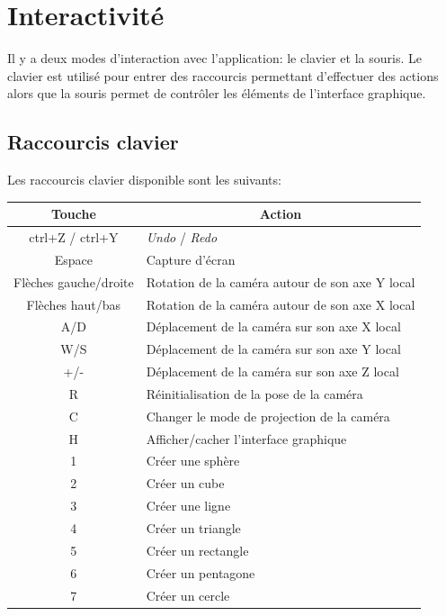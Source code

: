 \section{Interactivité}
\label{s:interactivité}

Il y a deux modes d'interaction avec l'application: le clavier et la souris.
Le clavier est utilisé pour entrer des raccourcis permettant d'effectuer des actions alors que la souris permet de contrôler les éléments de l'interface graphique.

\subsection{Raccourcis clavier}
Les raccourcis clavier disponible sont les suivants:

\begin{table}[h]
    \begin{center}
    \begin{tabular}{|c|l|}
        \hline
        \multicolumn{1}{|c|}{Touche} & \multicolumn{1}{c|}{Action}\\
        \hline
        ctrl+Z / ctrl+Y & \emph{Undo} / \emph{Redo}\\
        Espace & Capture d'écran\\  
        Flèches gauche/droite & Rotation de la caméra autour de son axe Y local\\
        Flèches haut/bas & Rotation de la caméra autour de son axe X local\\
        A/D & Déplacement de la caméra sur son axe X local\\
        W/S & Déplacement de la caméra sur son axe Y local\\
        +/- & Déplacement de la caméra sur son axe Z local\\
        R & Réinitialisation de la pose de la caméra\\
        C & Changer le mode de projection de la caméra\\
        H & Afficher/cacher l'interface graphique\\
        1 & Créer une sphère\\
        2 & Créer un cube\\
        3 & Créer une ligne\\
        4 & Créer un triangle\\
        5 & Créer un rectangle\\
        6 & Créer un pentagone\\
        7 & Créer un cercle\\

\end{tabular}
\end{center}
\end{table}
